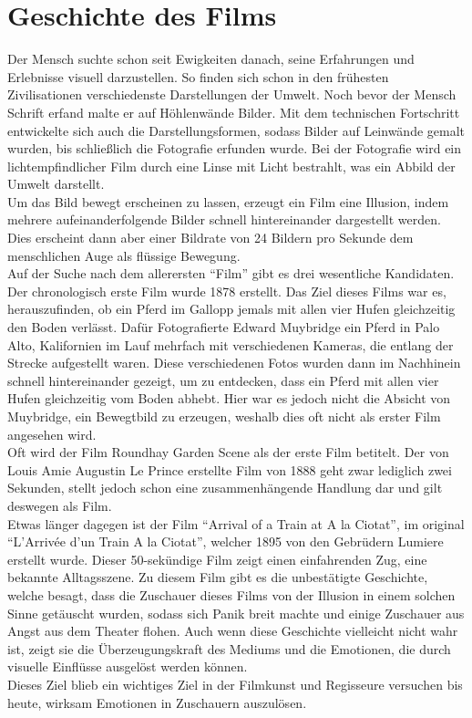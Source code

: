\section{Geschichte des Films}
Der Mensch suchte schon seit Ewigkeiten danach, seine Erfahrungen und Erlebnisse visuell darzustellen. So finden sich schon in den frühesten Zivilisationen verschiedenste Darstellungen der Umwelt. Noch bevor der Mensch Schrift erfand malte er auf Höhlenwände Bilder. Mit dem technischen Fortschritt entwickelte sich auch die Darstellungsformen, sodass Bilder auf Leinwände gemalt wurden, bis schließlich die Fotografie erfunden wurde. Bei der Fotografie wird ein lichtempfindlicher Film durch eine Linse mit Licht bestrahlt, was ein Abbild der Umwelt darstellt.\\
Um das Bild bewegt erscheinen zu lassen, erzeugt ein Film eine Illusion, indem mehrere aufeinanderfolgende Bilder schnell hintereinander dargestellt werden. Dies erscheint dann aber einer Bildrate von 24 Bildern pro Sekunde dem menschlichen Auge als flüssige Bewegung.\autocite{Schmidt.2013}\\
Auf der Suche nach dem allerersten \enquote{Film} gibt es drei wesentliche Kandidaten.\autocite{HeadsUp.} Der chronologisch erste Film wurde 1878 erstellt.\autocite{Muybridge.1878} Das Ziel dieses Films war es, herauszufinden, ob ein Pferd im Gallopp jemals mit allen vier Hufen gleichzeitig den Boden verlässt. Dafür Fotografierte Edward Muybridge ein Pferd in Palo Alto, Kalifornien im Lauf mehrfach mit verschiedenen Kameras, die entlang der Strecke aufgestellt waren. Diese verschiedenen Fotos wurden dann im Nachhinein schnell hintereinander gezeigt, um zu entdecken, dass ein Pferd mit allen vier Hufen gleichzeitig vom Boden abhebt. Hier war es jedoch nicht die Absicht von Muybridge, ein Bewegtbild zu erzeugen, weshalb dies oft nicht als erster Film angesehen wird.\\
Oft wird der Film Roundhay Garden Scene als der erste Film betitelt.\autocite{LePrince.1888} Der von Louis Amie Augustin Le Prince erstellte Film von 1888 geht zwar lediglich zwei Sekunden, stellt jedoch schon eine zusammenhängende Handlung dar und gilt deswegen als Film.\\
Etwas länger dagegen ist der Film \enquote{Arrival of a Train at A la Ciotat}, im original \enquote{L'Arrivée d'un Train A la Ciotat}, welcher 1895 von den Gebrüdern Lumiere erstellt wurde.\autocite{Lumiere.1895} Dieser 50-sekündige Film zeigt einen einfahrenden Zug, eine bekannte Alltagsszene. Zu diesem Film gibt es die unbestätigte Geschichte, welche besagt, dass die Zuschauer dieses Films von der Illusion in einem solchen Sinne getäuscht wurden, sodass sich Panik breit machte und einige Zuschauer aus Angst aus dem Theater flohen. Auch wenn diese Geschichte vielleicht nicht wahr ist, zeigt sie die Überzeugungskraft des Mediums und die Emotionen, die durch visuelle Einflüsse ausgelöst werden können.\\
Dieses Ziel blieb ein wichtiges Ziel in der Filmkunst und Regisseure versuchen bis heute, wirksam Emotionen in Zuschauern auszulösen.\\
